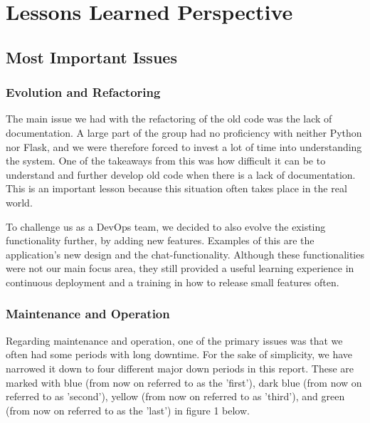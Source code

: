 \section{Lessons Learned Perspective}
\subsection{Most Important Issues}
\subsubsection{Evolution and Refactoring}
The main issue we had with the refactoring of the old code was the lack of documentation. 
A large part of the group had no proficiency with neither Python nor Flask, and we were therefore 
forced to invest a lot of time into understanding the system. 
One of the takeaways from this was how difficult it can be to understand and further develop 
old code when there is a lack of documentation. 
This is an important lesson because this situation often takes place in the real world.

To challenge us as a DevOps team, we decided to also evolve the existing functionality further, by adding new features. 
Examples of this are the application's new design and the chat-functionality. 
Although these functionalities were not our main focus area, they still provided 
a useful learning experience in continuous deployment and a training in how to release small features often.

\subsubsection{Maintenance and Operation}

Regarding maintenance and operation, one of the primary issues was that we often had some periods with long downtime. 
For the sake of simplicity, we have narrowed it down to four different major down periods in this report. 
These are marked with blue (from now on referred to as the 'first'), dark blue (from now on referred to as 'second'), 
yellow (from now on referred to as 'third'), and green (from now on referred to as the 'last') in figure 1 below. 

